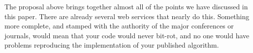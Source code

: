 \documentclass[conference]{IEEEtran}
\begin{document}
The proposal above brings together almost all of the points we have
discussed in this paper. There are already several web services that
nearly do this. Something more complete, and stamped with the
authority of the major conferences or journals, would mean that your
code would never bit-rot, and no one would have problems reproducing
the implementation of your published algorithm.






\end{document}
